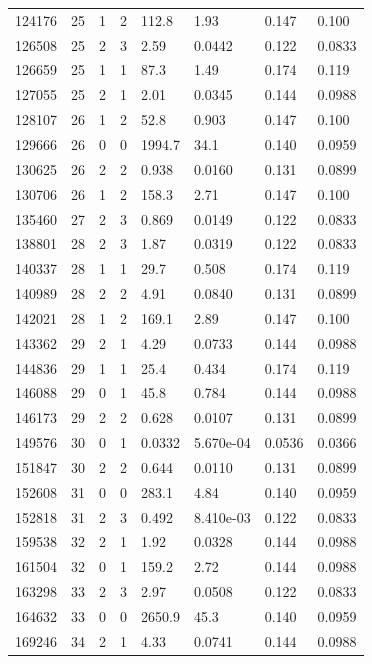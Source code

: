 \documentclass[preview]{standalone}
\begin{document}
{{{\begin{tabular}{L{1.2cm}C{1.2cm} C{0.3cm}C{0.5cm} C{1.4cm}C{1.4cm} C{1.4cm}C{1.4cm}}
  124176  &    25  & 1     &  2 &  112.8  & 1.93  & 0.147 &  0.100   \\ 
  126508  &    25  & 2     &  3 &  2.59  & 0.0442  & 0.122 &  0.0833   \\ 
  126659  &    25  & 1     &  1 &  87.3  & 1.49  & 0.174 &  0.119   \\ 
  127055  &    25  & 2     &  1 &  2.01  & 0.0345  & 0.144 &  0.0988   \\ 
  128107  &    26  & 1     &  2 &  52.8  & 0.903  & 0.147 &  0.100   \\ 
  129666  &    26  & 0     &  0 &  1994.7  & 34.1  & 0.140 &  0.0959   \\ 
  130625  &    26  & 2     &  2 &  0.938  & 0.0160  & 0.131 &  0.0899   \\ 
  130706  &    26  & 1     &  2 &  158.3  & 2.71  & 0.147 &  0.100   \\ 
  135460  &    27  & 2     &  3 &  0.869  & 0.0149  & 0.122 &  0.0833   \\ 
  138801  &    28  & 2     &  3 &  1.87  & 0.0319  & 0.122 &  0.0833   \\ 
  140337  &    28  & 1     &  1 &  29.7  & 0.508  & 0.174 &  0.119   \\ 
  140989  &    28  & 2     &  2 &  4.91  & 0.0840  & 0.131 &  0.0899   \\ 
  142021  &    28  & 1     &  2 &  169.1  & 2.89  & 0.147 &  0.100   \\ 
  143362  &    29  & 2     &  1 &  4.29  & 0.0733  & 0.144 &  0.0988   \\ 
  144836  &    29  & 1     &  1 &  25.4  & 0.434  & 0.174 &  0.119   \\ 
  146088  &    29  & 0     &  1 &  45.8  & 0.784  & 0.144 &  0.0988   \\ 
  146173  &    29  & 2     &  2 &  0.628  & 0.0107  & 0.131 &  0.0899   \\ 
  149576  &    30  & 0     &  1 &  0.0332  & 5.670e-04  & 0.0536 &  0.0366   \\ 
  151847  &    30  & 2     &  2 &  0.644  & 0.0110  & 0.131 &  0.0899   \\ 
  152608  &    31  & 0     &  0 &  283.1  & 4.84  & 0.140 &  0.0959   \\ 
  152818  &    31  & 2     &  3 &  0.492  & 8.410e-03  & 0.122 &  0.0833   \\ 
  159538  &    32  & 2     &  1 &  1.92  & 0.0328  & 0.144 &  0.0988   \\ 
  161504  &    32  & 0     &  1 &  159.2  & 2.72  & 0.144 &  0.0988   \\ 
  163298  &    33  & 2     &  3 &  2.97  & 0.0508  & 0.122 &  0.0833   \\ 
  164632  &    33  & 0     &  0 &  2650.9  & 45.3  & 0.140 &  0.0959   \\ 
  169246  &    34  & 2     &  1 &  4.33  & 0.0741  & 0.144 &  0.0988   \\ 
\hline 
\end{tabular} 

}}}
\end{document}
